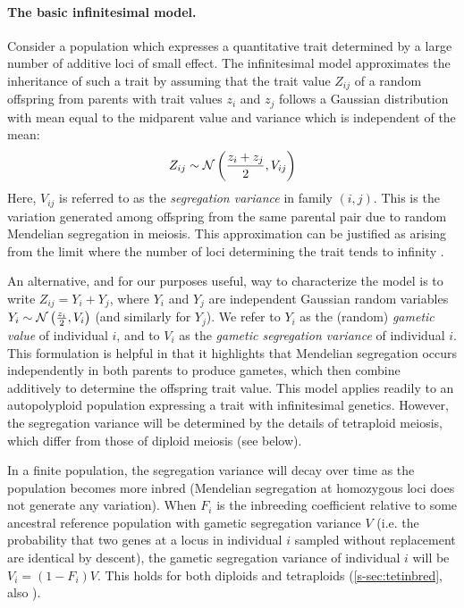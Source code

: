 \documentclass[12pt,a4paper]{article}
\begin{document}
\paragraph*{The basic infinitesimal model.}

Consider a population which expresses a quantitative trait determined by a
large number of additive loci of small effect.
The infinitesimal model approximates the inheritance of such a trait by
assuming that the trait value $Z_{ij}$ of a random offspring from parents with
trait values $z_i$ and $z_j$ follows a Gaussian distribution with mean equal to
the midparent value and variance which is independent of the mean:
  \begin{align}
  Z_{ij} \sim \mathcal{N}\left(\frac{z_i + z_j}{2}, V_{ij}\right)
  \label{eq:inf}
  \end{align}
Here, $V_{ij}$ is referred to as the \textit{segregation variance} in family
$(i,j)$.
This is the variation generated among offspring from the same parental pair due
to random Mendelian segregation in meiosis.
This approximation can be justified as arising from the limit where the number
of loci determining the trait tends to infinity \citep{barton2017}.

An alternative, and for our purposes useful, way to characterize the model
is to write $Z_{ij} = Y_i + Y_j$, where $Y_i$ and $Y_j$
are independent Gaussian random variables $Y_i \sim \mathcal{N}\left(\frac{z_i}{2},
V_i\right)$ (and similarly for $Y_j$).
We refer to $Y_i$ as the (random) \textit{gametic value} of individual $i$, and
to $V_i$ as the \textit{gametic segregation variance} of individual $i$.
This formulation is helpful in that it highlights that Mendelian segregation
occurs independently in both parents to produce gametes, which then combine
additively to determine the offspring trait value.
This model applies readily to an autopolyploid population expressing a trait
with infinitesimal genetics.
However, the segregation variance will be determined by the details of
tetraploid meiosis, which differ from those of diploid meiosis (see below).

In a finite population, the segregation variance will decay over time as the
population becomes more inbred (Mendelian segregation at homozygous loci does
not generate any variation).
When $F_i$ is the inbreeding coefficient relative to some ancestral reference
population with gametic segregation variance $V$ (i.e. the probability that two
genes at a locus in individual $i$ sampled without replacement are identical by
descent), the gametic segregation variance of individual $i$ will be
$V_i = (1-F_i)V$.
This holds for both diploids and tetraploids (\cref{s-sec:tetinbred}, also
\cite{moody1993}). 
\end{document}
